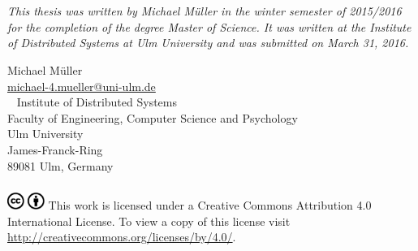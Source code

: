 \newpage

\section*{}
\subsection*{}
\thispagestyle{page_number_bottom_center}

\noindent\emph{This thesis was written by Michael Müller in the 
winter semester of 2015/2016 for the completion of the degree Master of 
Science. It was written at the Institute of Distributed Systems at Ulm 
University and was submitted on March 31, 2016.
}

\vspace{3cm}

{
\scriptsize
\noindent
Michael Müller\\
\href{mailto:michael-4.mueller@uni-ulm.de}{michael-4.mueller@uni-ulm.de}\\
\
\newline
\newline
Institute of Distributed Systems\\
Faculty of Engineering, Computer Science and Psychology\\ 
Ulm University\\
James-Franck-Ring\\
89081 Ulm, Germany
}

\subsubsection*{}
{
\scriptsize
\includegraphics[height=1.5em]{resources/logos/cc/cc.pdf} 
\includegraphics[height=1.5em]{resources/logos/cc/by.pdf} 
\newline
This work is licensed under a Creative Commons Attribution 4.0 International License. 
To view a copy of this license visit \url{http://creativecommons.org/licenses/by/4.0/}.
\newline\newline
}
